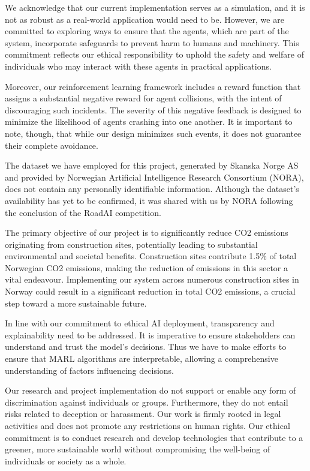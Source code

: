 \documentclass[conference]{IEEEtran}
\begin{document}
We acknowledge that our current implementation serves as a simulation, and it is not as robust as a
real-world application would need to be. However, we are committed to exploring ways to ensure that the
agents, which are part of the system, incorporate safeguards to prevent harm to humans and machinery.
This commitment reflects our ethical responsibility to uphold the safety and welfare of individuals who
may interact with these agents in practical applications.

Moreover, our reinforcement learning framework includes a reward function that assigns a substantial
negative reward for agent collisions, with the intent of discouraging such incidents. The severity of
this negative feedback is designed to minimize the likelihood of agents crashing into one another. It
is important to note, though, that while our design minimizes such events, it does not guarantee their
complete avoidance.

The dataset we have employed for this project, generated by Skanska Norge AS and provided by Norwegian
Artificial Intelligence Research Consortium (NORA), does not contain any personally identifiable
information. Although the dataset's availability has yet to be confirmed, it was shared with us by NORA
following the conclusion of the RoadAI competition.

The primary objective of our project is to significantly reduce CO2 emissions originating from
construction sites, potentially leading to substantial environmental and societal benefits.
Construction sites contribute 1.5\% of total Norwegian CO2 emissions, making the reduction of
emissions in this sector a vital endeavour. Implementing our system across numerous construction sites
in Norway could result in a significant reduction in total CO2 emissions, a crucial step toward a more
sustainable future.

In line with our commitment to ethical AI deployment, transparency and explainability need to be
addressed. It is imperative to ensure stakeholders can understand and trust the model's decisions.
Thus we have to make efforts to ensure that MARL algorithms are interpretable, allowing a comprehensive
understanding of factors influencing decisions.

Our research and project implementation do not support or enable any form of discrimination against
individuals or groups. Furthermore, they do not entail risks related to deception or harassment.
Our work is firmly rooted in legal activities and does not promote any restrictions on human rights.
Our ethical commitment is to conduct research and develop technologies that contribute to a greener,
more sustainable world without compromising the well-being of individuals or society as a whole.
\end{document}
